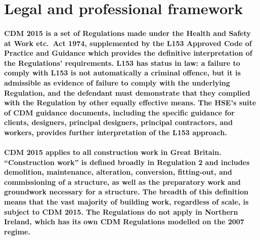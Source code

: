 \section{Legal and professional framework}

\paragraph{CDM 2015 is a set of Regulations made under the Health and Safety at Work etc.\ Act 1974, supplemented by the L153 Approved Code of Practice and Guidance which provides the definitive interpretation of the Regulations' requirements. L153 has status in law: a failure to comply with L153 is not automatically a criminal offence, but it is admissible as evidence of failure to comply with the underlying Regulation, and the defendant must demonstrate that they complied with the Regulation by other equally effective means. The HSE's suite of CDM guidance documents, including the specific guidance for clients, designers, principal designers, principal contractors, and workers, provides further interpretation of the L153 approach.}

\paragraph{CDM 2015 applies to all construction work in Great Britain. ``Construction work'' is defined broadly in Regulation 2 and includes demolition, maintenance, alteration, conversion, fitting-out, and commissioning of a structure, as well as the preparatory work and groundwork necessary for a structure. The breadth of this definition means that the vast majority of building work, regardless of scale, is subject to CDM 2015. The Regulations do not apply in Northern Ireland, which has its own CDM Regulations modelled on the 2007 regime.}

